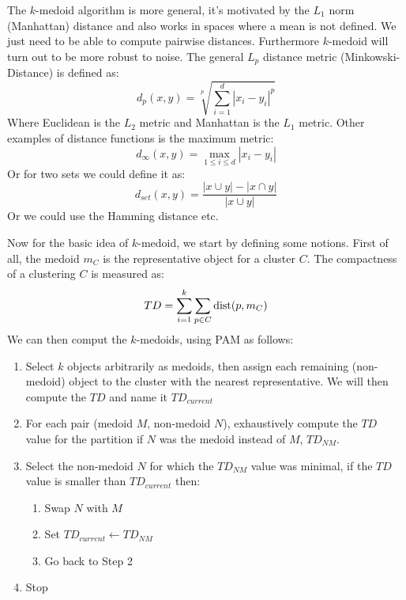     The $k$-medoid algorithm is more general, it's motivated by the $L_1$ norm 
    (Manhattan) distance and also works in spaces where a mean is not defined. 
    We just need to be able to compute pairwise distances. Furthermore 
    $k$-medoid will turn out to be more robust to noise. The general $L_p$ 
    distance metric (Minkowski-Distance) is defined as:
    \begin{equation*}
        d_p(x,y)=\sqrt[p]{\sum_{i=1}^{d}|x_i-y_i|^p}
    \end{equation*}
    Where Euclidean is the $L_2$ metric and Manhattan is the $L_1$ metric.
    Other examples of distance functions is the maximum metric:
    \begin{equation*}
        d_\infty(x,y)=\max_{1\leq i\leq d} |x_i-y_i|
    \end{equation*}
    Or for two sets we could define it as:
    \begin{equation*}
        d_{set}(x,y)=\frac{|x\cup y| - |x\cap y|}{|x\cup y|}
    \end{equation*}
    Or we could use the Hamming distance etc.
    
    Now for the basic idea of $k$-medoid, we start by defining some notions. 
    First of all, the medoid $m_C$ is the representative object for a cluster 
    $C$. The compactness of a clustering $C$ is measured as:
    \begin{equation*}
        TD=\sum_{i=1}^{k}\sum_{p\in C}\text{dist}(p, m_C)
    \end{equation*}
    We can then comput the $k$-medoids, using PAM as follows:
    \begin{enumerate}
        \item Select $k$ objects arbitrarily as medoids, then assign each 
        remaining (non-medoid) object to the cluster with the nearest 
        representative. We will then compute the $TD$ and name it $TD_{current}$
        \item For each pair (medoid $M$, non-medoid $N$), exhaustively compute 
        the $TD$ value for the partition if $N$ was the medoid instead of $M$, 
        $TD_{NM}$.
        \item Select the non-medoid $N$ for which the $TD_{NM}$ value was 
        minimal, if the $TD$ value is smaller than $TD_{current}$ then:
        \begin{enumerate}
            \item Swap $N$ with $M$
            \item Set $TD_{current} \gets TD_{NM}$
            \item Go back to Step 2
        \end{enumerate}
        \item Stop
    \end{enumerate}
    
